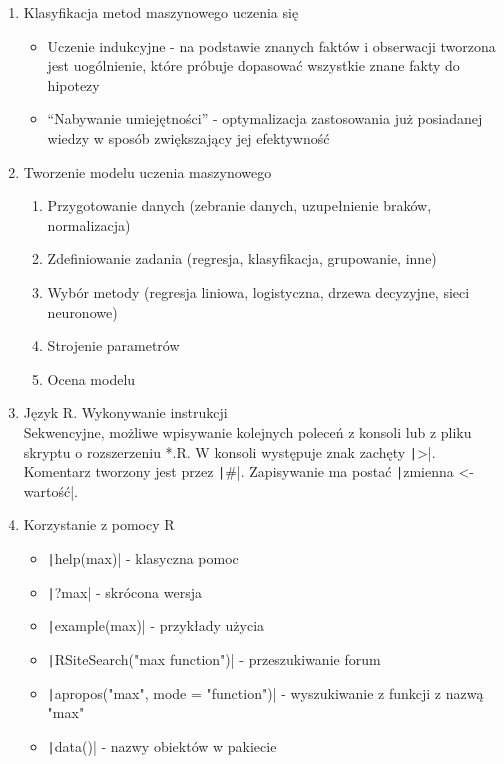\documentclass[11pt]{article}
\begin{document}
\begin{enumerate}
\begin{itemize}
        \end{itemize}
        \item Klasyfikacja metod maszynowego uczenia się
        \begin{itemize}
            \item Uczenie indukcyjne - na podstawie znanych faktów i obserwacji tworzona
            jest uogólnienie, które próbuje dopasować wszystkie znane fakty do hipotezy
            \item ``Nabywanie umiejętności'' - optymalizacja zastosowania już posiadanej
            wiedzy w sposób zwiększający jej efektywność
        \end{itemize}
        \item Tworzenie modelu uczenia maszynowego
        \begin{enumerate}
            \item Przygotowanie danych (zebranie danych, uzupełnienie braków, normalizacja)
            \item Zdefiniowanie zadania (regresja, klasyfikacja, grupowanie, inne)
            \item Wybór metody (regresja liniowa, logistyczna, drzewa decyzyjne,
            sieci neuronowe)
            \item Strojenie parametrów
            \item Ocena modelu
        \end{enumerate}
        \item Język R. Wykonywanie instrukcji\\
        Sekwencyjne, możliwe wpisywanie kolejnych poleceń z konsoli lub z pliku skryptu
        o rozszerzeniu *.R.
        W konsoli występuje znak zachęty \texttt|>|.
        Komentarz tworzony jest przez \texttt|#|.
        Zapisywanie ma postać \texttt|zmienna <- wartość|.
        \item Korzystanie z pomocy R
        \begin{itemize}
        	\item \texttt|help(max)| - klasyczna pomoc
        	\item \texttt|?max| - skrócona wersja
        	\item \texttt|example(max)| - przykłady użycia
        	\item \texttt|RSiteSearch("max function")| - przeszukiwanie forum
        	\item \texttt|apropos("max", mode = "function")| - wyszukiwanie z funkcji z nazwą "max"
        	\item \texttt|data()| - nazwy obiektów w pakiecie

\end{itemize}
\end{enumerate}
\end{document}
